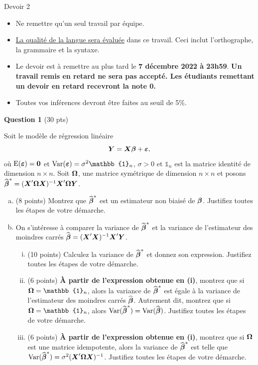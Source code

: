 \documentclass[letter, 11pt]{article}
\newcommand{\bm}{\boldmath}
\newcommand{\um}{\unboldmath}
\newcommand{\boY}{\mbox{\bm$Y$\um}}
\newcommand{\bobeta}{\mbox{\bm$\beta$}}
\newcommand{\boeps}{\mbox{\bm$\varepsilon$\um}}
\newcommand{\bo}[1]{\mbox{\bm$#1$\um}}
\begin{document}
\vspace*{0.05 in}
\begin{center}
{\Large Devoir 2 }
\end{center}

\begin{itemize}
\item Ne remettre qu'un seul travail par équipe.
\item \underline{La qualité de la langue sera évaluée} dans ce travail. Ceci inclut l'orthographe, la grammaire et la syntaxe.
\item Le devoir est à remettre au plus tard le {\bf 7 décembre 2022 à 23h59}. {\bf Un travail remis en retard ne sera pas accepté. Les étudiants remettant un devoir en retard recevront la note 0.}
\item Toutes vos inférences devront être faites au seuil de 5\%.
\end{itemize}

\vspace{0.2in}

\vspace{0.1 in}
\textbf{Question 1} (30 pts)
\vspace{0.1in}

Soit le mod\`ele de r\'egression lin\'eaire 
$$\boY=\bo{X}\bobeta+\boeps,$$
o\`u $\mathrm{E}(\boeps) = {\bf 0}$ et $\mathrm{Var}(\boeps)=\sigma^2 \mathbb{1}_n $, $\sigma>0$ et $\mathbb{1}_n$ est la
matrice identit\'e de dimension $n\times n$. Soit $\bo{\Omega}$, une matrice sym\'etrique de dimension $n\times n$ et posons $\widehat{\bobeta}^*=(\bo{X}'\bo{\Omega}\bo{X})^{-1}\bo{X}'\bo{\Omega}\boY$.

\begin{enumerate}[(a)]
	\item (8 points) Montrez que $\widehat{\bobeta}^*$ est un estimateur non biais\'e de $\bobeta$. Justifiez toutes les étapes de votre démarche.
	\item On s'intéresse à comparer la variance de  $\widehat{\bobeta}^*$ et la variance de l'estimateur des moindres carrés $\widehat{\bobeta}=(\bo{X}'\bo{X})^{-1}\bo{X}'\boY$. 
		\begin{enumerate}[(i)]
		\item (10 points) Calculez la variance de $\widehat{\bobeta}^*$ et donnez son expression. Justifiez toutes les étapes de votre démarche.
		\item (6 points) {\bf À partir de l'expression obtenue en (i)}, montrez que si $\bo{\Omega} = \mathbb{1}_n$, alors la variance de $\widehat{\bobeta}^*$ est égale à la variance de l'estimateur des moindres carrés $\widehat{\bobeta}$. Autrement dit, montrez que si $\bo{\Omega} = \mathbb{1}_n$, alors $\mathrm{Var}(\widehat{\bobeta}^*) = \mathrm{Var}(\widehat{\bobeta})$. Justifiez toutes les étapes de votre démarche.
    \item (6 points) {\bf À partir de l'expression obtenue en (i)}, montrez que si $\bo{\Omega}$ est une matrice idempotente, alors la variance de $\widehat{\bobeta}^*$ est telle que $\mathrm{Var}(\widehat{\bobeta}^*) = \sigma^2 (\bo{X}'\bo{\Omega}\bo{X})^{-1} $. Justifiez toutes les étapes de votre démarche.
		\end{enumerate}
\end{enumerate}
\end{document}

